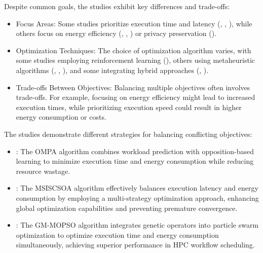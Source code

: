 \documentclass[a4paper, final]{article}
\begin{document}
\noindent Despite common goals, the studies exhibit key differences and trade-offs:
\begin{itemize}
    \item Focus Areas: Some studies prioritize execution time and latency (\cite{bib:1_acrl}, \cite{bib:4_faas}, \cite{bib:3_sandcat}), while others focus on energy efficiency (\cite{bib:6_marine}, \cite{bib:5_epee}, \cite{bib:10}) 
    or privacy preservation (\cite{bib:7_ppps}).

    \item Optimization Techniques: The choice of optimization algorithm varies, with some studies employing 
    reinforcement learning (\cite{bib:1_acrl}), others using metaheuristic algorithms (\cite{bib:6_marine}, \cite{bib:3_sandcat}, \cite{bib:10}), and some integrating hybrid approaches (\cite{bib:2_faro}, \cite{bib:9}).
    
    \item Trade-offs Between Objectives: Balancing multiple objectives often involves trade-offs. For example, 
    focusing on energy efficiency might lead to increased execution times, while prioritizing execution speed could 
    result in higher energy consumption or costs.
\end{itemize}

\noindent The studies demonstrate different strategies for balancing conflicting objectives:
\begin{itemize}
    \item \cite{bib:6_marine}: The OMPA algorithm combines workload prediction with opposition-based learning to minimize 
    execution time and energy consumption while reducing resource wastage.

    \item \cite{bib:3_sandcat}: The MSISCSOA algorithm effectively balances execution latency and energy consumption 
    by employing a multi-strategy optimization approach, enhancing global optimization capabilities and preventing 
    premature convergence.
    
    \item \cite{bib:10}: The GM-MOPSO algorithm integrates genetic operators into particle swarm optimization to optimize 
    execution time and energy consumption simultaneously, achieving superior performance in HPC workflow scheduling.
\end{itemize}
\end{document}
